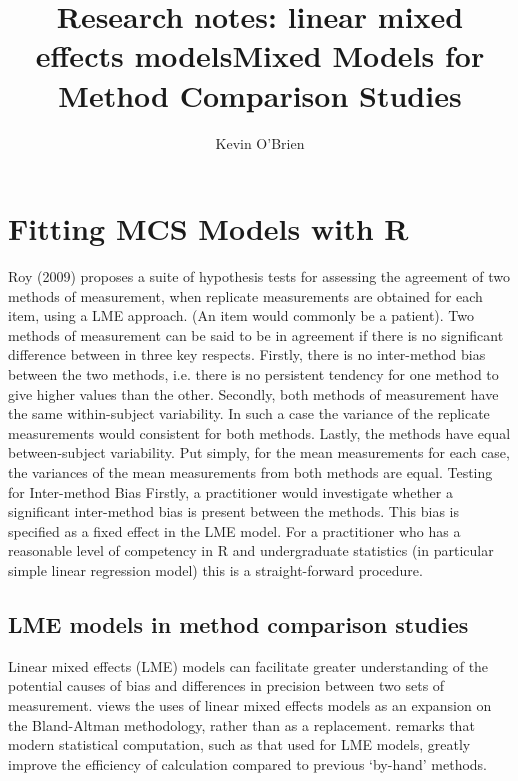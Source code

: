 \documentclass[12pt, a4paper]{report}
\title{Research notes: linear mixed effects models}
\author{ } \date{ }
\theoremstyle{plain}
\theoremstyle{definition}
\theoremstyle{remark}
\begin{document}
	\author{Kevin O'Brien}
	\title{Mixed Models for Method Comparison Studies}
	\tableofcontents
	
	\chapter{Fitting MCS Models with R}

Roy (2009) proposes a suite of hypothesis tests for assessing the agreement of two methods of measurement, when replicate measurements are obtained for each item, using a LME approach. (An item would commonly be a patient).  Two methods of measurement can be said to be in agreement if there is no significant difference between in three key respects. Firstly, there is no inter-method bias between the two methods, i.e. there is no persistent tendency for one method to give higher values than the other.
Secondly, both methods of measurement have the same  within-subject variability. In such a case the variance of the replicate measurements would consistent for both methods.
Lastly, the methods have equal between-subject variability.  Put simply, for the mean measurements for each case, the variances of the mean measurements from both methods are equal.
Testing for Inter-method Bias
Firstly, a practitioner would investigate whether a significant inter-method bias is present between the methods. This bias is specified as a fixed effect in the LME model.  For a practitioner who has a reasonable level of competency in R and undergraduate statistics (in particular simple linear regression model) this is a straight-forward procedure.
	\section{LME models in method comparison studies}
	
	Linear mixed effects (LME) models can facilitate greater understanding of the potential causes of bias and differences in
	precision between two sets of measurement. \citet{LaiShiao} views the uses of linear mixed effects models as an expansion on the
	Bland-Altman methodology, rather than as a replacement.
	\citet{BXC2008} remarks that modern statistical computation, such as that used for LME models, greatly improve the efficiency of
	calculation compared to previous `by-hand' methods. 
	
\end{document}
